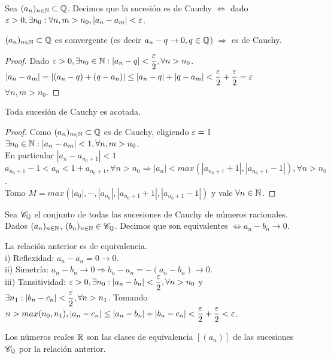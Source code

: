 \begin{definition}
  Sea $(a_n)_{n \in \mathbb{N}} \subset \mathbb{Q}$. Decimos que la sucesión es de Cauchy $\iff$ dado $\varepsilon > 0, \exists n_0 : \forall n,m > n_0, |a_n - a_m| < \varepsilon$.
\end{definition}

\begin{theorem}
  $(a_n)_{n \in \mathbb{N}} \subset \mathbb{Q}$ es convergente (es decir $a_n - q \to 0, q \in \mathbb{Q}$) $\Rightarrow$ es de Cauchy.
  \begin{proof}
    Dado $\varepsilon > 0, \exists n_0 \in \mathbb{N} : |a_n - q| < \dfrac{\varepsilon}{2}, \forall n > n_0$. \\
    $|a_n - a_m| = |(a_n - q) + (q - a_n)| \leq |a_n - q| + |q - a_m| < \dfrac{\varepsilon}{2} + \dfrac{\varepsilon}{2} = \varepsilon$ \\
    $\forall n,m > n_0$.
  \end{proof}
\end{theorem}

\begin{theorem}
  Toda sucesión de Cauchy es acotada.

  \begin{proof}
    Como $(a_n)_{n \in \mathbb{N}} \subset \mathbb{Q}$ es de Cauchy, eligiendo $\varepsilon = 1$ \\
    $\exists n_0 \in \mathbb{N} : |a_n - a_m| < 1, \forall n,m > n_0$. \\
    En particular $|a_n - a_{n_0+1}| < 1$ \\
    $a_{n_0+1} - 1 < a_n < 1 + a_{n_0+1}, \forall n > n_0 \Rightarrow |a_n| < max(|a_{n_0+1} + 1|, |a_{n_0+1} - 1|), \forall n > n_0$. \\
    Tomo $M = max(|a_0|, \cdots, |a_{n_0}|, |a_{n_0+1} + 1|, |a_{n_0+1} - 1|)$ y vale $\forall n \in \mathbb{N}$.
  \end{proof}
\end{theorem}

\begin{definition}
  Sea $\mathscr{C}_{\mathbb{Q}}$ el conjunto de todas las sucesiones de Cauchy de números racionales. Dados $(a_n)_{n \in \mathbb{N}}$, $(b_n)_{n \in \mathbb{N}} \in \mathscr{C}_{\mathbb{Q}}$. Decimos que son equivalentes $\iff a_n - b_n \to 0$.
\end{definition}

\clearpage

\begin{prop}
  La relación anterior es de equivalencia. \\
  i) Reflexidad: $a_n - a_n = 0 \to 0$. \\
  ii) Simetría: $a_n - b_n \to 0 \Rightarrow b_n - a_n = -(a_n-b_n) \to 0$. \\
  iii) Tansitividad: $\varepsilon > 0, \exists n_0 : |a_n - b_n| < \dfrac{\varepsilon}{2}, \forall n > n_0$
  y $\exists n_1 : |b_n - c_n| < \dfrac{\varepsilon}{2}, \forall n > n_1$. Tomando $n > max(n_0, n_1), |a_n - c_n| \leq |a_n - b_n| + |b_n - c_n| < \dfrac{\varepsilon}{2} + \dfrac{\varepsilon}{2} < \varepsilon$.
\end{prop}

\begin{definition}
  Los números reales $\mathbb{R}$ son las clases de equivalencia $[(a_n)]$ de las sucesiones $\mathscr{C}_{\mathbb{Q}}$ por la relación anterior.
\end{definition}
